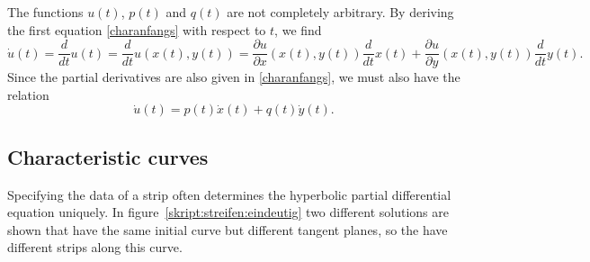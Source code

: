 The functions $u(t)$, $p(t)$ and $q(t)$ are not completely arbitrary.
By deriving the first equation \eqref{charanfangs} with respect to $t$,
we find
\[
\dot{u}(t)=\frac{d}{dt}u(t)
=
\frac{d}{dt}u(x(t),y(t))
=
\frac{\partial u}{\partial x}(x(t), y(t))\frac{d}{dt}x(t)
+
\frac{\partial u}{\partial y}(x(t), y(t))\frac{d}{dt}y(t).
\]
Since the partial derivatives are also given in \eqref{charanfangs},
we must also have the relation
\begin{equation}
\dot{u}(t)= p(t)\dot{x}(t) + q(t)\dot{y}(t).
\label{cauchydatarestriction}
\end{equation}

\subsection{Characteristic curves\label{subsection:characteristics-curves}}
Specifying the data of a strip often determines the hyperbolic
partial differential equation uniquely.
In figure~\ref{skript:streifen:eindeutig} two different solutions
are shown that have the same initial curve but different tangent
planes, so the have different strips along this curve.

